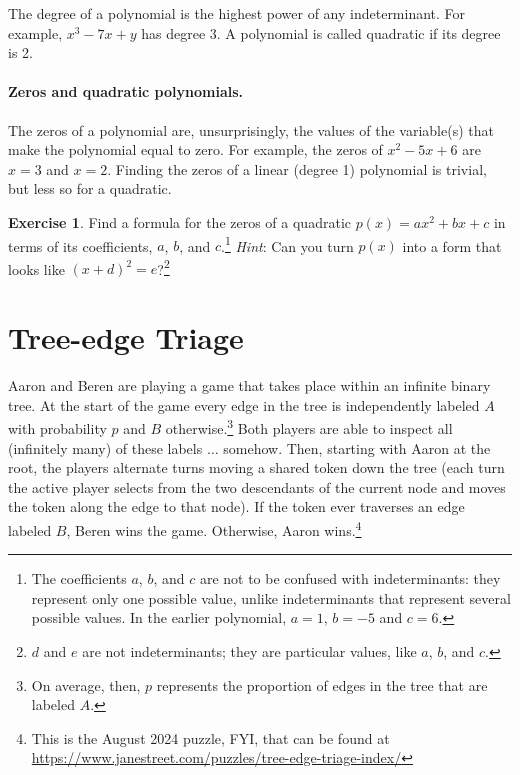 \documentclass{book}
\theoremstyle{definition}
\newtheorem{exercise}{Exercise}[chapter]
\theoremstyle{colonstylebf}
\begin{document}
The degree of a polynomial is the highest power of any indeterminant. For example, $x^3 - 7x + y$ has degree 3. A polynomial is called quadratic if its degree is 2.

\subsubsection*{Zeros and quadratic polynomials.}
The zeros of a polynomial are, unsurprisingly, the values of the variable(s) that make the polynomial equal to zero. For example, the zeros of $x^2 - 5x + 6$ are $x = 3$ and $x = 2$. Finding the zeros of a linear (degree 1) polynomial is trivial, but less so for a quadratic.

\begin{exercise}\label{completesquare}
Find a formula for the zeros of a quadratic $p(x) = ax^2 + bx + c$ in terms of its coefficients, $a$, $b$, and $c$.\footnote{The coefficients $a$, $b$, and $c$ are not to be confused with indeterminants: they represent only one possible value, unlike indeterminants that represent several possible values. In the earlier polynomial, $a = 1$, $b = -5$ and $c = 6$.} \emph{Hint}: Can you turn $p(x)$ into a form that looks like $(x + d)^2 = e$?\footnote{$d$ and $e$ are not indeterminants; they are particular values, like $a$, $b$, and $c$.}
\end{exercise}

\chapter{Tree-edge Triage}\label{statement}
\noindent Aaron and Beren are playing a game that takes place within an infinite binary tree. At the start of the game every edge in the tree is independently labeled $A$ with probability $p$  and $B$ otherwise.\footnote{On average, then, $p$ represents the proportion of edges in the tree that are labeled $A$.} Both players are able to inspect all (infinitely many) of these labels $\ldots$ somehow. Then, starting with Aaron at the root, the players alternate turns moving a shared token down the tree (each turn the active player selects from the two descendants of the current node and moves the token along the edge to that node). If the token ever traverses an edge labeled $B$, Beren wins the game. Otherwise, Aaron wins.\footnote{This is the August 2024 puzzle, FYI, that can be found at \url{https://www.janestreet.com/puzzles/tree-edge-triage-index/}}
\end{document}
